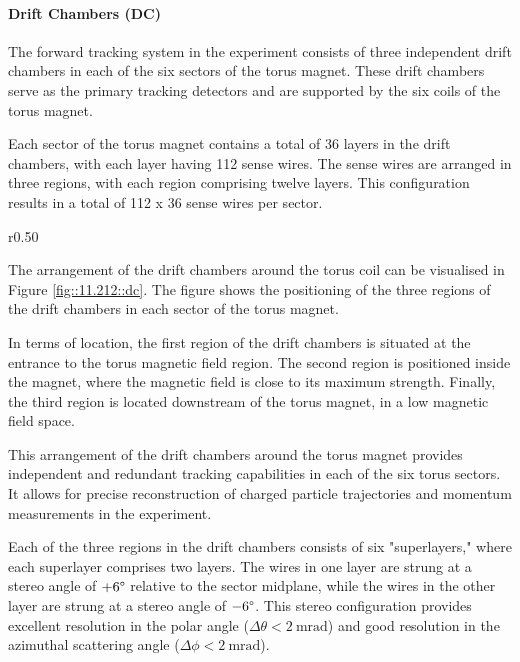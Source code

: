 \paragraph{Drift Chambers (DC)}
    The forward tracking system in the experiment consists of three independent drift chambers in each of the six sectors of the torus magnet.
    These drift chambers serve as the primary tracking detectors and are supported by the six coils of the torus magnet.

    Each sector of the torus magnet contains a total of 36 layers in the drift chambers, with each layer having 112 sense wires.
    The sense wires are arranged in three regions, with each region comprising twelve layers.
    This configuration results in a total of 112 x 36 sense wires per sector.

    \begin{wrapfigure}{r}{0.50\textwidth}
        \caption[Drift Chambers (DC)]
        {Drift Chambers (DC) render.
        Each of the DC regions are denoted as R1, R2, and R3 in the figure.}
        \label{fig::11.212::dc}
    \end{wrapfigure}

    The arrangement of the drift chambers around the torus coil can be visualised in Figure \ref{fig::11.212::dc}.
    The figure shows the positioning of the three regions of the drift chambers in each sector of the torus magnet.

    In terms of location, the first region of the drift chambers is situated at the entrance to the torus magnetic field region.
    The second region is positioned inside the magnet, where the magnetic field is close to its maximum strength.
    Finally, the third region is located downstream of the torus magnet, in a low magnetic field space.

    This arrangement of the drift chambers around the torus magnet provides independent and redundant tracking capabilities in each of the six torus sectors.
    It allows for precise reconstruction of charged particle trajectories and momentum measurements in the experiment.

    Each of the three regions in the drift chambers consists of six "superlayers," where each superlayer comprises two layers.
    The wires in one layer are strung at a stereo angle of $+6\degree$ relative to the sector midplane, while the wires in the other layer are strung at a stereo angle of $-6\degree$.
    This stereo configuration provides excellent resolution in the polar angle ($\Delta\theta < 2 ~\text{mrad}$) and good resolution in the azimuthal scattering angle ($\Delta\phi < 2 ~\text{mrad}$).

